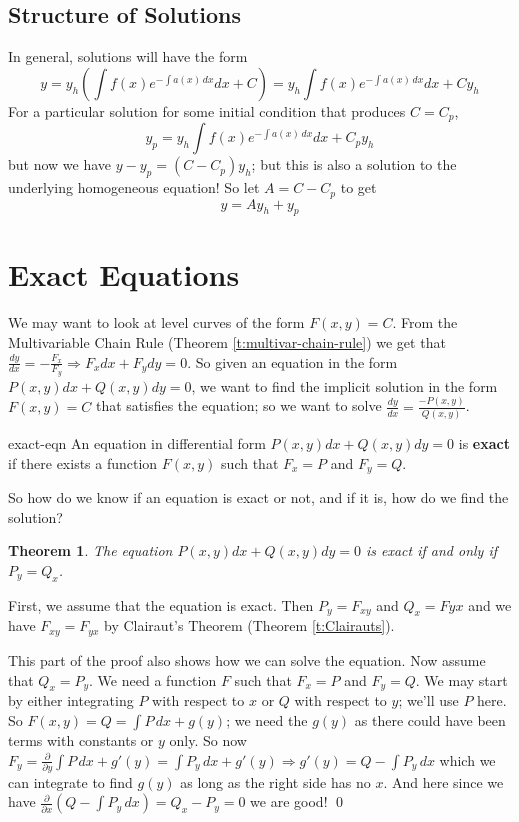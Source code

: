 \documentclass[letterpaper, 11pt, openany]{book}
\newcommand{\pd}[2]{\frac{\partial #1}{\partial #2}}
\theoremstyle{mytheoremstyle}
\newtheorem{theorem}{Theorem}[section]
\renewenvironment{proof}{{\par \sffamily \smaller \fontseries{b}\selectfont Proof}}{\hfill\qed}
\theoremstyle{myexamplestyle}
\begin{document}
\subsection{Structure of Solutions}
In general, solutions will have the form
\[y = y_{h}\left(\int f(x) e^{-\int a(x)\, dx} dx + C\right) = y_{h}\int f(x) e^{-\int a(x)\, dx} dx + Cy_{h}\]
For a particular solution for some initial condition that produces \(C = C_{p}\),
\[y_{p} = y_{h}\int f(x) e^{-\int a(x)\, dx} dx + C_{p}y_{h}\]
but now we have \(y - y_{p} = (C-C_{p})y_{h}\); but this is also a solution to the underlying homogeneous equation! So let \(A = C-C_{p}\) to get
\[y = A y_{h} + y_{p}\]

\section{Exact Equations}
\setcounter{figure}{0}
We may want to look at level curves of the form \(F(x,y) = C\). From the Multivariable Chain Rule (Theorem \ref{t:multivar-chain-rule}) we get that \(\frac{dy}{dx} = - \frac{F_{x}}{F_{y}} \Rightarrow F_{x} dx + F_{y} dy = 0\). So given an equation in the form \(P(x,y) dx + Q(x,y)dy = 0\), we want to find the implicit solution in the form \(F(x,y) = C\) that satisfies the equation; so we want to solve \(\frac{dy}{dx} = \frac{-P(x,y)}{Q(x,y)}\).

\begin{definition}{}{exact-eqn}
    An equation in differential form \(P(x,y) dx + Q(x,y)dy = 0\) is \textbf{exact} if there exists a function \(F(x,y)\) such that \(F_{x} = P\) and \(F_{y} = Q\).
\end{definition}

So how do we know if an equation is exact or not, and if it is, how do we find the solution?

\begin{theorem}\label{t:exact-eqn-soln}
    The equation \(P(x,y) dx + Q(x,y) dy = 0\) is exact if and only if \(P_{y} = Q_{x}\).
\end{theorem}

\begin{proof}
    First, we assume that the equation is exact. Then \(P_{y} = F_{xy}\) and \(Q_{x} = F{yx}\) and we have \(F_{xy} = F_{yx}\) by Clairaut's Theorem (Theorem \ref{t:Clairauts}).

    This part of the proof also shows how we can solve the equation. Now assume that \(Q_{x} = P_{y}\). We need a function \(F\) such that \(F_{x} = P\) and \(F_{y} = Q\). We may start by either integrating \(P\) with respect to \(x\) or \(Q\) with respect to \(y\); we'll use \(P\) here. So \(F(x,y) = Q = \int P \, dx + g(y)\); we need the \(g(y)\) as there could have been terms with constants or \(y\) only. So now \(F_{y} = \pd{}{y}\int P \, dx + g'(y) = \int P_{y} \, dx + g'(y) \Rightarrow g'(y) = Q - \int P_{y} \, dx\) which we can integrate to find \(g(y)\) as long as the right side has no \(x\). And here since we have \(\pd{}{x} \left(Q - \int P_{y} \, dx\right) = Q_{x} - P_{y} = 0\) we are good!
\end{proof}
\end{document}
